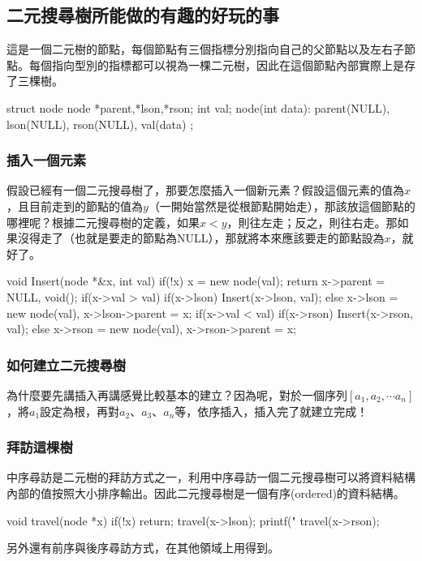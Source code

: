 \documentclass[main.tex]{subfiles}
\begin{document}
 \subsection{二元搜尋樹所能做的有趣的好玩的事}
這是一個二元樹的節點，每個節點有三個指標分別指向自己的父節點以及左右子節點。每個指向型別的指標都可以視為一棵二元樹，因此在這個節點內部實際上是存了三棵樹。
 \begin{C++}
struct node {
    node *parent,*lson,*rson;
    int val;
    node(int data):
    	parent(NULL), lson(NULL), rson(NULL), val(data){}
};
 \end{C++}
 \subsubsection{插入一個元素}
 假設已經有一個二元搜尋樹了，那要怎麼插入一個新元素？假設這個元素的值為$x$，且目前走到的節點的值為$y$（一開始當然是從根節點開始走），那該放這個節點的哪裡呢？根據二元搜尋樹的定義，如果$x < y$，則往左走；反之，則往右走。那如果沒得走了（也就是要走的節點為NULL），那就將本來應該要走的節點設為$x$，就好了。
 \begin{C++}
void Insert(node *&x, int val) {
    if(!x) {
        x = new node(val);
        return x->parent = NULL, void();
    }
    if(x->val > val){
        if(x->lson) Insert(x->lson, val);
        else x->lson =
            new node(val), x->lson->parent = x;
    }
    if(x->val < val){
        if(x->rson) Insert(x->rson, val);
        else x->rson =
            new node(val), x->rson->parent = x;
    }
}
 \end{C++}
 \subsubsection{如何建立二元搜尋樹}
 為什麼要先講插入再講感覺比較基本的建立？因為呢，對於一個序列$[a_1, a_2, \cdots a_n]$，將$a_1$設定為根，再對$a_2$、$a_3$、$a_n$等，依序插入，插入完了就建立完成！
 \subsubsection{拜訪這棵樹}
 中序尋訪是二元樹的拜訪方式之一，利用中序尋訪一個二元搜尋樹可以將資料結構內部的值按照大小排序輸出。因此二元搜尋樹是一個有序(ordered)的資料結構。
 \begin{C++}
void travel(node *x){
    if(!x) return;
    travel(x->lson);
    printf("%
    travel(x->rson);
}
 \end{C++}
\indent\indent 另外還有前序與後序尋訪方式，在其他領域上用得到。
\end{document}
